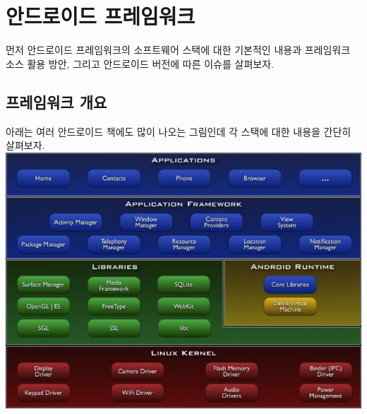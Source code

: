 \chapter{안드로이드 프레임워크}
먼저 안드로이드 프레임워크의 소프트웨어 스택에 대한 기본적인 내용과 프레임워크 소스 활용 방안, 그리고 안드로이드 버전에 따른 이슈를 살펴보자.

\section{프레임워크 개요}
아래는 여러 안드로이드 책에도 많이 나오는 그림인데 각 스택에 대한 내용을 간단히 살펴보자.\\

\includegraphics[scale=0.65]{system-architecture}
